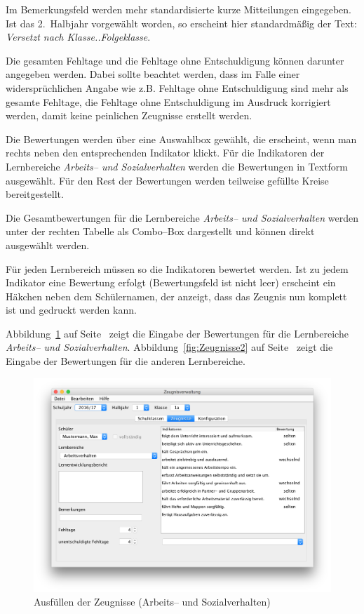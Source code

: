 \documentclass[a4paper,notitlepage,parskip]{scrartcl}
\newcommand\ott{\normalfont\ttfamily}
\begin{document}
Im Bemerkungsfeld werden mehr standardisierte kurze Mitteilungen eingegeben.
Ist das 2.~Halbjahr vorgewählt worden, so erscheint hier standardmäßig der Text: \emph{Versetzt nach Klasse..{\ott Folgeklasse}}.

Die gesamten Fehltage und die Fehltage ohne Entschuldigung können darunter angegeben werden.
Dabei sollte beachtet werden, dass im Falle einer widersprüchlichen Angabe wie z.B. Fehltage ohne Entschuldigung sind mehr als gesamte Fehltage, die Fehltage ohne Entschuldigung im Ausdruck korrigiert werden, damit keine peinlichen Zeugnisse erstellt werden. 

Die Bewertungen werden über eine Auswahlbox gewählt, die erscheint, wenn man rechts neben den entsprechenden Indikator klickt. Für die Indikatoren der Lernbereiche \emph{Arbeits-- und Sozialverhalten} werden die Bewertungen in Textform ausgewählt. Für den Rest der Bewertungen werden teilweise gefüllte Kreise bereitgestellt.

Die Gesamtbewertungen für die Lernbereiche \emph{Arbeits-- und Sozialverhalten} werden unter der rechten Tabelle als Combo--Box dargestellt und können direkt ausgewählt werden.

Für jeden Lernbereich müssen so die Indikatoren bewertet werden.
Ist zu jedem Indikator eine Bewertung erfolgt (Bewertungsfeld ist nicht leer) erscheint ein Häkchen neben dem Schülernamen, der anzeigt, dass das Zeugnis nun komplett ist und gedruckt werden kann.

Abbildung~\ref{fig:Zeugnisse} auf Seite~\pageref{fig:Zeugnisse} zeigt die Eingabe der Bewertungen für die Lernbereiche \emph{Arbeits-- und Sozialverhalten}.
Abbildung~\ref{fig:Zeugnisse2} auf Seite~\pageref{fig:Zeugnisse2} zeigt die Eingabe der Bewertungen für die anderen Lernbereiche.

\begin{figure}[ht]
\centering
\centerline{\includegraphics[width=1.0\textwidth]{Zeugnisse}}
\caption{Ausfüllen der Zeugnisse (Arbeits-- und Sozialverhalten)}
\label{fig:Zeugnisse}
\end{figure}
\end{document}
